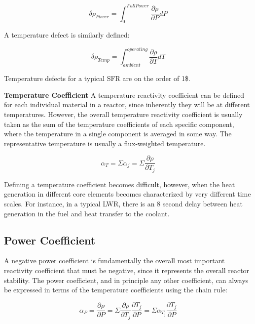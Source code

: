 \documentclass[10pt]{article}
\begin{document}
\begin{flushleft}
\begin{equation}
\label{eq:PowerDefect}
\delta\rho_{Power}=\int_{0}^{Full Power} \frac{\partial\rho}{\partial P}dP
\end{equation}

A temperature defect is similarly defined:

\begin{equation}
\label{eq:TemperatureDefect}
\delta\rho_{Temp}=\int_{ambient}^{operating} \frac{\partial\rho}{\partial T}dT
\end{equation}

Temperature defects for a typical SFR are on the order of 1\$.

\textbf{Temperature Coefficient}
A temperature reactivity coefficient can be defined for each individual material in a reactor, since inherently they will be at different temperatures. However, the overall temperature reactivity coefficient is usually taken as the sum of the temperature coefficients of each specific component, where the temperature in a single component is averaged in some way. The representative temperature is usually a flux-weighted temperature. 

\begin{equation}
\label{eq:TotalTempCoef}
\alpha_T = \Sigma \alpha_j = \Sigma \frac{\partial\rho}{\partial T_j}
\end{equation}

Defining a temperature coefficient becomes difficult, however, when the heat generation in different core elements becomes characterized by very different time scales. For instance, in a typical LWR, there is an 8 second delay between heat generation in the fuel and heat transfer to the coolant.

\subsection{Power Coefficient}

A negative power coefficient is fundamentally the overall most important reactivity coefficient that must be negative, since it represents the overall reactor stability. The power coefficient, and in principle any other coefficient, can always be expressed in terms of the temperature coefficients using the chain rule:

\begin{equation}
\label{eq:PowerCoefficient}
\alpha_P = \frac{\partial\rho}{\partial P} = \Sigma \frac{\partial\rho}{\partial T_j}\frac{\partial T_j}{\partial P} = \Sigma \alpha_{T_j}\frac{\partial T_j}{\partial P}
\end{equation}


\end{flushleft}
\end{document}
